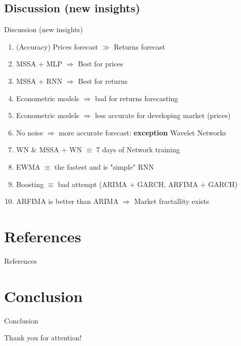 \documentclass[11pt, aspectratio= 169]{beamer}
\begin{document}
	\subsection{Discussion (new insights)}
	\begin{frame}{Discussion (new insights)}
		\begin{enumerate}
			\item (Accuracy) Prices forecast $\gg$ Returns forecast
			\item MSSA + MLP $\Rightarrow$ Best for prices
			\item MSSA + RNN $\Rightarrow$ Best for returns
			\item Econometric models $\Rightarrow$ bad for returns forecasting
			\item Econometric models $\Rightarrow$ less accurate for developing market (prices)
			\item No noise $\Rightarrow$ more accurate forecast: \textbf{exception} Wavelet Networks
			\item WN \& MSSA + WN $\equiv$ 7 days of Network training
			\item EWMA $\equiv$ the fastest and is "simple" RNN
			\item Boosting $\equiv$ bad attempt (ARIMA + GARCH, ARFIMA + GARCH)
			\item ARFIMA is better than ARIMA $\Rightarrow$ Market fractallity exists \cite{mandelbrot2006misbehavior}
		\end{enumerate}
	\end{frame}
	
	\section{References}
	\begin{frame}[allowframebreaks]{References}
		
		
	\end{frame}
	
	\section{Conclusion}
	\begin{frame}{Conclusion}
		\begin{center}
			\LARGE
			Thank you for attention!
		\end{center}
	\end{frame}
\end{document}

